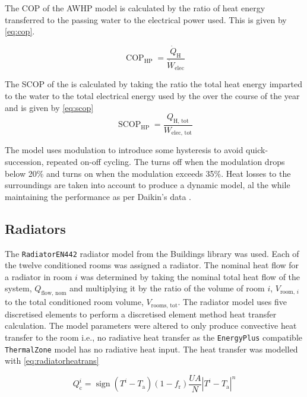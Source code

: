 The \ac{COP} of the \ac{AWHP} model is calculated by the ratio of heat energy transferred to the passing water to the electrical power used. This is given by \cref{eq:cop}. 

\begin{equation}
    \operatorname{COP}_\text{HP}=\frac{\dot{Q}_\text{H}}{\dot{W}_\text{elec}}\label{eq:cop}
\end{equation}

The \ac{SCOP} of the \HP is calculated by taking the ratio the total heat energy imparted to the water to the total electrical energy used by the \HP over the course of the year and is given by \cref{eq:scop}
\begin{equation}
    \operatorname{SCOP}_\text{HP}=\frac{Q_\text{H, tot}}{W_\text{elec, tot}}\label{eq:scop}
\end{equation}

The model uses modulation to introduce some hysteresis to avoid quick-succession, repeated on-off cycling. The \HP turns off when the modulation drops below 20\% and turns on when the modulation exceeds 35\%. Heat losses to the surroundings are taken into account to produce a dynamic model, al the while maintaining the performance as per Daikin's data \cite{daikin_altherma_tech_2006}.

\subsection{Radiators}
The \texttt{RadiatorEN442} radiator model from the Buildings library \cite{wetter_modelica_2014} was used. Each of the twelve conditioned rooms was assigned a radiator. The nominal heat flow for a radiator in room $i$ was determined by taking the nominal total heat flow of the system, $Q_\text{flow, nom}$ and multiplying it by the ratio of the volume of room $i$, $V_{\text{room, }i}$ to the total conditioned room volume, $V_\text{rooms, tot}$. The radiator model uses five discretised elements to perform a discretised element method heat transfer calculation. The model parameters were altered to only produce convective heat transfer to the room i.e., no radiative heat transfer as the \texttt{EnergyPlus} compatible \texttt{ThermalZone} model has no radiative heat input. The heat transfer was modelled with \cref{eq:radiatorheatrans} 


\begin{equation}
    Q_\text{c}^i=\operatorname{sign}(T^i-T_\text{a})(1-f_\text{r})\frac{UA}{N}|T^i-T_\text{a}|^n\label{eq:radiatorheatrans}
\end{equation}

